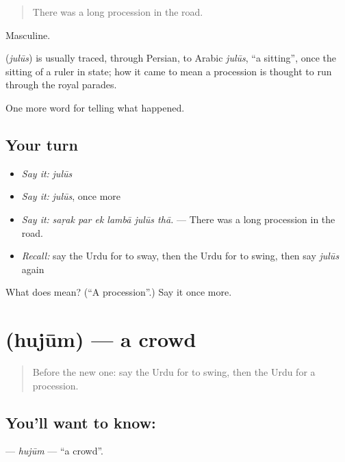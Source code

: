 \begin{quote}
There was a long procession in the road.
\end{quote}

Masculine.

\begin{cousinweb}
\textbf{} (\emph{julūs}) is usually traced, through Persian, to Arabic \emph{julūs}, \textquotedblleft{}a sitting\textquotedblright{}, once the sitting of a ruler in state; how it came to mean a procession is thought to run through the royal parades.
\end{cousinweb}

\begin{grammarlens}[title={What you've built}]
One more word for telling what happened.
\end{grammarlens}

\subsection*{Your turn}
\begin{itemize}
\raggedright
  \item \emph{Say it:} \emph{julūs}
  \item \emph{Say it:} \emph{julūs}, once more
  \item \emph{Say it:} \emph{saṛak par ek lambā julūs thā.} — There was a long procession in the road.
  \item \emph{Recall:} say the Urdu for to sway, then the Urdu for to swing, then say \emph{julūs} again
\end{itemize}

\begin{tcolorbox}[breakable,colback=teal!4,colframe=teal!35!black,title={Before you move on}]
What does  mean? (\textquotedblleft{}A procession\textquotedblright{}.) Say it once more.
\end{tcolorbox}
\section[\texorpdfstring{\ur{ہجوم} (hujūm)}{ہجوم (hujūm)}]{ (hujūm) — a crowd}

\label{lesson:UR-C321-hujum}



\begin{quote}
Before the new one: say the Urdu for to swing, then the Urdu for a procession.
\end{quote}

\subsection*{You'll want to know: }
\textbf{} — \emph{hujūm} — \textquotedblleft{}a crowd\textquotedblright{}.

